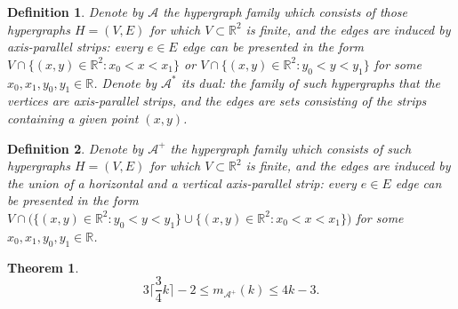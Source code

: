 \documentclass[11pt,oneside]{amsart}
\newcommand{\R}{\mathbb{R}}
\newcommand{\A}{\mathcal{A}}
\newtheorem{theorem}{Theorem}
\newtheorem{definition}{Definition}
\begin{document}
\begin{definition} Denote by $\A$ the hypergraph family which consists of those hypergraphs $H=(V,E)$ for which $V\subset \R^2$ is finite, and the edges are induced by axis-parallel strips: every $e\in E$ edge can be presented in the form $V\cap\{(x,y)\in\R^2: x_0<x<x_1\}$ or $V\cap\{(x,y)\in\R^2: y_0<y<y_1\}$ for some $x_0, x_1, y_0, y_1 \in\R$. Denote by $\A^*$ its dual: the family of such hypergraphs that the vertices are axis-parallel strips, and the edges are sets consisting of the strips containing a given point $(x,y)$. 
\end{definition}

\begin{definition} Denote by $\A^+$ the hypergraph family which consists of such hypergraphs $H=(V,E)$ for which $V\subset \R^2$ is finite, and the edges are induced by the union of a horizontal and a vertical axis-parallel strip: every $e\in E$ edge can be presented in the form $V\cap\big(\{(x,y)\in\R^2: y_0<y<y_1\}\cup \{(x,y)\in\R^2: x_0<x<x_1\}\big)$ for some $x_0,x_1,y_0,y_1\in\R$. 
\end{definition}

\begin{theorem}\label{kereszt}
$$3\bigg\lceil \frac{3}{4}k\bigg\rceil -2\le m_{\A^+}(k)\le 4k-3.$$
\end{theorem}
\end{document}
